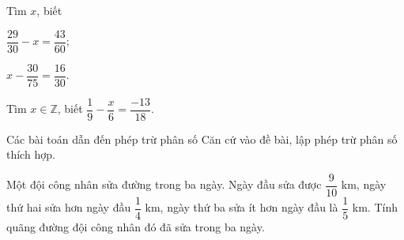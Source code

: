 \begin{vd}%
	Tìm $x$, biết
	\begin{enumEX}{2}
		\item $\dfrac{29}{30}-x=\dfrac{43}{60}$;
		\item $x-\dfrac{30}{75}=\dfrac{16}{30}$.
		\end{enumEX}
\end{vd}
\begin{vd}%
	Tìm $x\in \mathbb{Z}$, biết $\dfrac{1}{9}-\dfrac{x}{6}=\dfrac{-13}{18}$.
\end{vd}
\begin{dang}{Các bài toán dẫn đến phép trừ phân số}
Căn cứ vào đề bài, lập phép trừ phân số thích hợp.
\end{dang}
\begin{vd}%
	Một đội công nhân sửa đường trong ba ngày. Ngày đầu sửa được $\dfrac{9}{10}$ km, ngày thứ hai sửa hơn ngày đầu $\dfrac{1}{4}$ km, ngày thứ ba sửa ít hơn ngày đầu là $\dfrac{1}{5}$ km. Tính quãng đường đội công nhân đó đã sửa trong ba ngày.
\end{vd}
